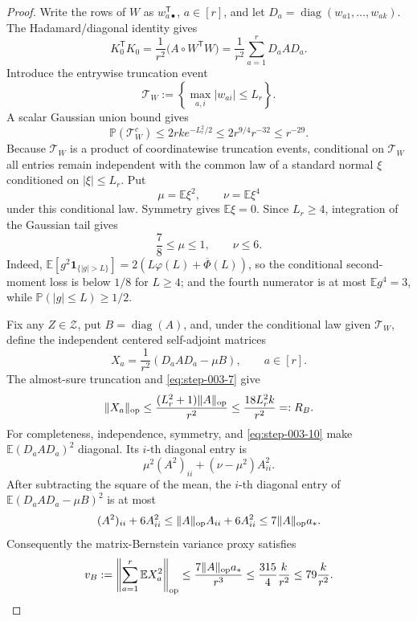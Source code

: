 \begin{proof}
Write the rows of \(W\) as \(w_{a\bullet}^{\mathsf T}\),
\(a\in[r]\), and let
\(D_a=\operatorname{diag}(w_{a1},\ldots,w_{ak})\). The Hadamard/diagonal
identity gives
\begin{equation}
  K_0^{\mathsf T}K_0
  =\frac1{r^2}\bigl(A\circ W^{\mathsf T}W\bigr)
  =\frac1{r^2}\sum_{a=1}^r D_aAD_a.                        \label{eq:step-003-8}
\end{equation}
Introduce the entrywise truncation event
\[
  \mathcal T_W:=\left\{\max_{a,i}|w_{ai}|\le L_r\right\}.
\]
A scalar Gaussian union bound gives
\begin{equation}
  \mathbb P(\mathcal T_W^c)
  \le2rk e^{-L_r^2/2}
  \le2r^{9/4}r^{-32}
  \le r^{-29}.                                             \label{eq:step-003-9}
\end{equation}
Because \(\mathcal T_W\) is a product of coordinatewise truncation events,
conditional on \(\mathcal T_W\) all entries remain independent with the
common law of a standard normal \(\xi\) conditioned on
\(|\xi|\le L_r\). Put
\[
  \mu=\mathbb E\xi^2,\qquad \nu=\mathbb E\xi^4
\]
under this conditional law. Symmetry gives \(\mathbb E\xi=0\). Since
\(L_r\ge4\), integration of the Gaussian tail gives
\begin{equation}
  \frac78\le\mu\le1,\qquad \nu\le6.                     \label{eq:step-003-10}
\end{equation}
Indeed,
\(\mathbb E[g^2\mathbf1_{\{|g|>L\}}]
 =2(L\varphi(L)+\overline\Phi(L))\), so the conditional second-moment loss
is below \(1/8\) for \(L\ge4\); and the fourth numerator is at most
\(\mathbb Eg^4=3\), while
\(\mathbb P(|g|\le L)\ge1/2\).

Fix any \(Z\in\mathcal Z\), put \(B=\operatorname{diag}(A)\), and, under
the conditional law given \(\mathcal T_W\), define the independent centered
self-adjoint matrices
\begin{equation}
  X_a=\frac1{r^2}(D_aAD_a-\mu B),\qquad a\in[r].            \label{eq:step-003-11}
\end{equation}
The almost-sure truncation and \eqref{eq:step-003-7} give
\begin{equation}
  \|X_a\|_{\rm op}
  \le\frac{(L_r^2+1)\|A\|_{\rm op}}{r^2}
  \le\frac{18L_r^2k}{r^2}=:R_B.                            \label{eq:step-003-12}
\end{equation}
For completeness, independence, symmetry, and \eqref{eq:step-003-10} make
\(\mathbb E(D_aAD_a)^2\) diagonal. Its \(i\)-th diagonal entry is
\[
  \mu^2(A^2)_{ii}+(\nu-\mu^2)A_{ii}^2.
\]
After subtracting the square of the mean, the \(i\)-th diagonal entry of
\(\mathbb E(D_aAD_a-\mu B)^2\) is at most
\[
  (A^2)_{ii}+6A_{ii}^2
  \le \|A\|_{\rm op}A_{ii}+6A_{ii}^2
  \le7\|A\|_{\rm op}a_*.
\]
Consequently the matrix-Bernstein variance proxy satisfies
\begin{equation}
  v_B:=\left\|\sum_{a=1}^r\mathbb EX_a^2\right\|_{\rm op}
  \le\frac{7\|A\|_{\rm op}a_*}{r^3}
  \le\frac{315}{4}\frac{k}{r^2}
  \le79\frac{k}{r^2}.                                     \label{eq:step-003-13}
\end{equation}


\end{proof}
